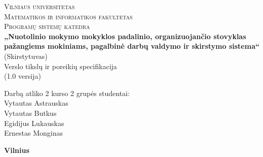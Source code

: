 \begin{titlepage}

  \begin{center}

    \textsc{\Large Vilniaus universitetas\\
    Matematikos ir informatikos fakultetas\\
    Programų sistemų katedra}\\[6.0cm]

    \textbf{ \LARGE „Nuotolinio mokymo mokyklos padalinio, 
    organizuojančio stovyklas pažangiems mokiniams, pagalbinė darbų 
    valdymo ir skirstymo sistema“ }\\
    { \Large (Skirstytuvas)}\\[0.5cm]

    {\Large Verslo tikslų ir poreikių specifikacija }\\[0.5cm]

    {\Large (1.0 versija)}\\[3.0cm]

    \begin{minipage}[]{0.8\textwidth}
      \begin{flushright} 
        Darbą atliko 2 kurso 2 grupės studentai: \\
        Vytautas Astrauskas \\
        Vytautas Butkus \\
        Egidijus Lukauskas \\
        Ernestas Monginas
      \end{flushright}
    \end{minipage}

    \vfill

    \textbf{\large  Vilnius \\ \the\year }
  \end{center}
  
\end{titlepage}
